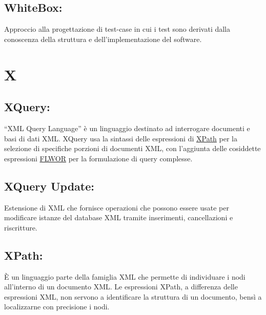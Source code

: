 \section{WhiteBox:}
Approccio alla progettazione di test-case in cui i test sono derivati dalla conoscenza della struttura e dell'implementazione del software.

\chapter{X}
\hypertarget{XQuery}{}
\section{XQuery:}
``XML Query Language'' \`e un linguaggio destinato ad interrogare documenti e basi di dati XML.
XQuery usa la sintassi delle espressioni di \hyperlink{XPath}{XPath} per la selezione di specifiche porzioni di documenti XML, con l'aggiunta delle cosiddette espressioni \hyperlink{FLWOR}{FLWOR} per la formulazione di query complesse.

\hypertarget{XQuery Update}{}
\section{XQuery Update:}
Estensione di XML che fornisce operazioni che possono essere usate per modificare istanze del database XML tramite inserimenti, cancellazioni e riscritture.
\hypertarget{XPath}{}
\section{XPath:}
\`E un linguaggio parte della famiglia XML che permette di individuare i nodi all'interno di un documento XML. Le espressioni XPath, a differenza delle espressioni XML, non servono a identificare la struttura di un documento, bens\`i a localizzarne con precisione i nodi.



